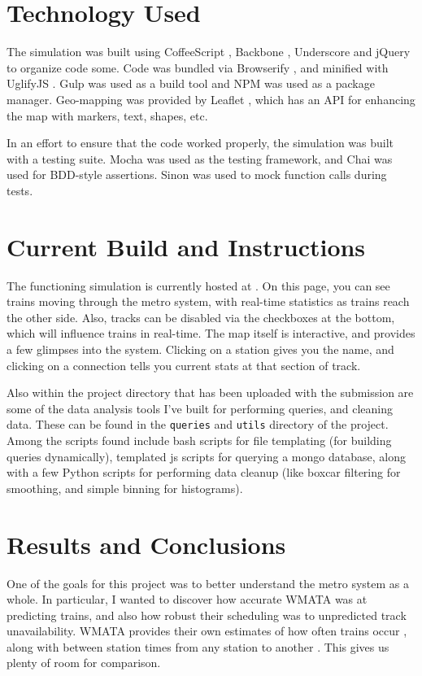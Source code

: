 \documentclass[a4paper,12pt]{article}
\begin{document}
\section{Technology Used}
The simulation was built using CoffeeScript \cite{coffeescript}, Backbone \cite{backbone}, Underscore
\cite{underscore} and jQuery \cite{jQuery} to organize code some. Code was bundled via Browserify \cite{browserify},
and minified with UglifyJS \cite{uglify}. Gulp \cite{gulp} was used as a build tool and NPM \cite{npm} was used as a
package manager. Geo-mapping was provided by Leaflet \cite{leaflet}, which has an API for enhancing the map with
markers, text, shapes, etc.

In an effort to ensure that the code worked properly, the simulation was built with a testing suite. Mocha \cite{mocha}
was used as the testing framework, and Chai \cite{chai} was used for BDD-style assertions. Sinon \cite{sinon} was used
to mock function calls during tests.

\section{Current Build and Instructions}
The functioning simulation is currently hosted at \cite{aprilandchip}. On this page, you can see trains moving through
the metro system, with real-time statistics as trains reach the other side. Also, tracks can be disabled via the
checkboxes at the bottom, which will influence trains in real-time. The map itself is interactive, and provides a few
glimpses into the system. Clicking on a station gives you the name, and clicking on a connection tells you current stats
at that section of track.

Also within the project directory that has been uploaded with the submission are some of the data analysis tools I've
built for performing queries, and cleaning data. These can be found in the \texttt{queries} and \texttt{utils}
directory of the project. Among the scripts found include bash scripts for file templating (for building queries
dynamically), templated js scripts for querying a mongo database, along with a few Python scripts for performing data
cleanup (like boxcar filtering for smoothing, and simple binning for histograms).

\section{Results and Conclusions}
One of the goals for this project was to better understand the metro system as a whole. In particular, I wanted to
discover how accurate WMATA was at predicting trains, and also how robust their scheduling was to unpredicted track
unavailability. WMATA provides their own estimates of how often trains occur \cite{metroschedule}, along with between
station times from any station to another \cite{rosslyntime}. This gives us plenty of room for comparison.
\end{document}
